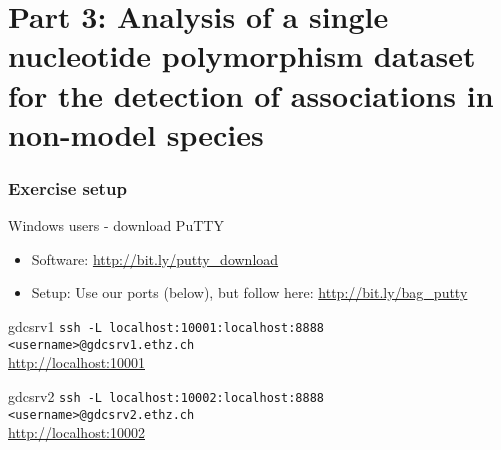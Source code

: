 
\section[Part 3]{Part 3: Analysis of a single nucleotide polymorphism
dataset for the detection of associations in non-model species}

\begin{frame}
\frametitle{Exercise setup}

\begin{block}{Windows users - download PuTTY}
\begin{itemize}
\item{Software: \url{http://bit.ly/putty\_download}}
\item{Setup: Use our ports (below), but follow here:
\url{http://bit.ly/bag\_putty}}
\end{itemize}
\end{block}


\begin{block}{gdcsrv1}
\texttt{ssh -L localhost:10001:localhost:8888 <username>@gdcsrv1.ethz.ch}\\
\url{http://localhost:10001}
\end{block}


\begin{block}{gdcsrv2}
\texttt{ssh -L localhost:10002:localhost:8888 <username>@gdcsrv2.ethz.ch}\\
\url{http://localhost:10002}
\end{block}




\end{frame}



